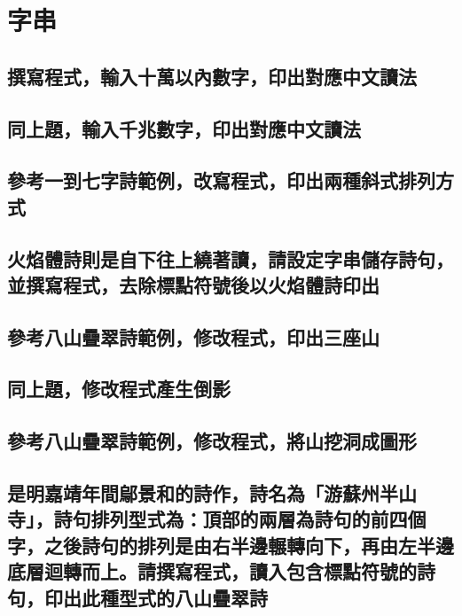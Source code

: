 \chapter{字串}

\section{撰寫程式，輸入十萬以內數字，印出對應中文讀法}


\section{同上題，輸入千兆數字，印出對應中文讀法}


\section{參考一到七字詩範例，改寫程式，印出兩種斜式排列方式}


\section{火焰體詩則是自下往上繞著讀，請設定字串儲存詩句，並撰寫程式，去除標點符號後以火焰體詩印出}


\section{參考八山疊翠詩範例，修改程式，印出三座山}


\section{同上題，修改程式產生倒影}


\section{參考八山疊翠詩範例，修改程式，將山挖洞成圖形}


\section{是明嘉靖年間鄔景和的詩作，詩名為「游蘇州半山寺」，詩句排列型式為：頂部的兩層為詩句的前四個字，之後詩句的排列是由右半邊輾轉向下，再由左半邊底層迴轉而上。請撰寫程式，讀入包含標點符號的詩句，印出此種型式的八山疊翠詩}


